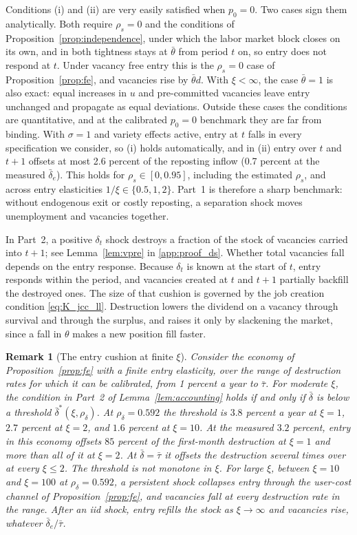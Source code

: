 \documentclass[authoryear, review, 12pt]{elsarticle}
\newtheorem{remark}{Remark}
\begin{document}
Conditions (i) and (ii) are very easily satisfied when $p_0=0$. Two
cases sign them analytically. Both require $\rho_s=0$ and the
conditions of Proposition~\ref{prop:independence}, under which the
labor market block closes on its own, and in both tightness stays at
$\bar\theta$ from period $t$ on, so entry does not respond at $t$.
Under vacancy free entry this is the $\rho_s=0$ case of Proposition~\ref{prop:fe}, and vacancies
rise by $\bar\theta d$.
With $\xi<\infty$, the case $\bar\theta=1$ is also exact: equal
increases in $u$ and pre-committed vacancies leave entry unchanged and
propagate as equal deviations. Outside these cases the conditions are
quantitative, and at the calibrated $p_0=0$ benchmark they are far
from binding. With $\sigma=1$ and variety effects active, entry at
$t$ falls in every specification we consider, so (i) holds
automatically, and in (ii) entry over $t$ and $t+1$ offsets at most
2.6 percent of the reposting inflow (0.7 percent at the measured
$\bar\delta_e$). This holds for $\rho_s\in[0,0.95]$, including the
estimated $\rho_s$, and across entry elasticities $1/\xi\in\{0.5,1,2\}$.
Part~1 is therefore a sharp benchmark: without endogenous exit or
costly reposting, a separation shock moves unemployment and vacancies
together.

In Part~2, a positive $\delta_t$ shock destroys a fraction of the stock of vacancies carried
into $t+1$; see Lemma~\ref{lem:vpre} in \ref{app:proof_ds}. Whether total vacancies fall
depends on the entry response. Because $\delta_t$ is known at the start of $t$, entry
responds within the period, and vacancies created at $t$ and $t+1$ partially backfill the
destroyed ones. The size of that cushion is governed by the job creation condition
\eqref{eq:K_jcc_ll}. Destruction lowers the dividend on a vacancy through survival and
through the surplus, and raises it only by slackening the market, since a fall in $\theta$
makes a new position fill faster.

\begin{remark}[The entry cushion at finite $\xi$]\label{rem:finite_xi}
Consider the economy of Proposition~\ref{prop:fe} with a finite entry elasticity, over the
range of destruction rates for which it can be calibrated, from 1 percent a year to
$\bar\tau$. For moderate $\xi$, the condition in Part~2 of Lemma~\ref{lem:accounting} holds
if and only if $\bar\delta$ is below a threshold $\bar\delta^*(\xi,\rho_\delta)$. At
$\rho_\delta=0.592$ the threshold is $3.8$ percent a year at $\xi=1$, $2.7$ percent at
$\xi=2$, and $1.6$ percent at $\xi=10$. At the measured $3.2$ percent, entry in this economy
offsets $85$ percent of the first-month destruction at $\xi=1$ and more than all of it at
$\xi=2$. At $\bar\delta=\bar\tau$ it offsets the destruction several times over at every
$\xi\leq2$. The threshold is not monotone in $\xi$. For large $\xi$, between $\xi=10$ and
$\xi=100$ at $\rho_\delta=0.592$, a persistent shock collapses entry through the user-cost
channel of Proposition~\ref{prop:fe}, and vacancies fall at every destruction rate in the
range. After an iid shock, entry refills the stock as $\xi\to\infty$ and vacancies rise,
whatever $\bar\delta_e/\bar\tau$.
\end{remark}
\end{document}
